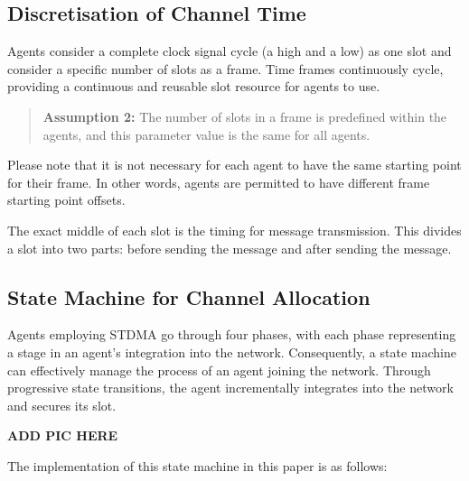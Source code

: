 \subsection{Discretisation of Channel Time}

Agents consider a complete clock signal cycle (a high and a low) as one slot and consider a specific number of slots as a frame.
Time frames continuously cycle, providing a continuous and reusable slot resource for agents to use.


\begin{quotation}
    \textbf{Assumption 2:} 
    The number of slots in a frame is predefined within the agents, and this parameter value is the same for all agents.
\end{quotation}


Please note that it is not necessary for each agent to have the same starting point for their frame. 
In other words, agents are permitted to have different frame starting point offsets.

The exact middle of each slot is the timing for message transmission.
This divides a slot into two parts: before sending the message and after sending the message.

\subsection{State Machine for Channel Allocation}

Agents employing STDMA go through four phases\cite{STDMA}, with each phase representing a stage in an agent's integration into the network. Consequently, a state machine can effectively manage the process of an agent joining the network. Through progressive state transitions, the agent incrementally integrates into the network and secures its slot.

\textbf{ADD PIC HERE} %

The implementation of this state machine in this paper is as follows:

